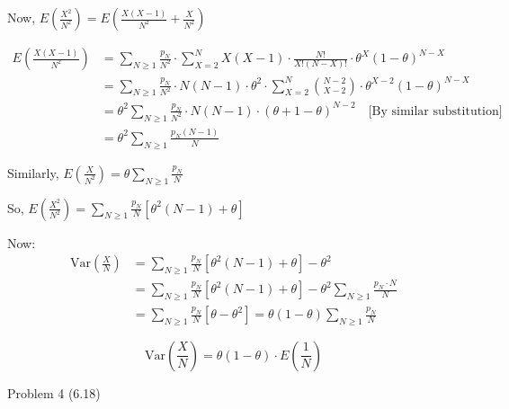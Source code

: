 \documentclass[12pt,a4paper,onecolumn]{exam}
\newcommand{\questionheader}[1]{%
  \begin{tcolorbox}[
    enhanced,
    colback=black,
    coltext=white,
    boxrule=0pt,
    fontupper=\Large\bfseries,
    arc=4mm
  ]
  #1
  \end{tcolorbox}%
}
\begin{document}
\begin{solution}
Now, $E\left(\frac{X^2}{N^2}\right) = E\left(\frac{X(X-1)}{N^2} + \frac{X}{N^2}\right)$

\begin{align*}
E\left(\frac{X(X-1)}{N^2}\right) &= \sum_{N \geq 1} \frac{p_N}{N^2} \cdot \sum_{X=2}^{N} X(X-1) \cdot \frac{N!}{X!(N-X)!} \cdot \theta^X (1-\theta)^{N-X} \\
&= \sum_{N \geq 1} \frac{p_N}{N^2} \cdot N(N-1) \cdot \theta^2 \cdot \sum_{X=2}^{N} \binom{N-2}{X-2} \cdot \theta^{X-2} (1-\theta)^{N-X} \\
&= \theta^2 \sum_{N \geq 1} \frac{p_N}{N^2} \cdot N(N-1) \cdot (\theta + 1 - \theta)^{N-2} \quad \text{[By similar substitution]} \\
&= \theta^2 \sum_{N \geq 1} \frac{p_N (N-1)}{N}
\end{align*}

Similarly, $E\left(\frac{X}{N^2}\right) = \theta \sum_{N \geq 1} \frac{p_N}{N}$

So, $E\left(\frac{X^2}{N^2}\right) = \sum_{N \geq 1} \frac{p_N}{N} \left[\theta^2(N-1) + \theta\right]$

Now:
\begin{align*}
\text{Var}\left(\frac{X}{N}\right) &= \sum_{N \geq 1} \frac{p_N}{N} \left[\theta^2(N-1) + \theta\right] - \theta^2 \\
&= \sum_{N \geq 1} \frac{p_N}{N} \left[\theta^2(N-1) + \theta\right] - \theta^2 \sum_{N \geq 1} \frac{p_N \cdot N}{N} \\
&= \sum_{N \geq 1} \frac{p_N}{N} \left[\theta - \theta^2\right] = \theta(1-\theta) \sum_{N \geq 1} \frac{p_N}{N}
\end{align*}

\[
\boxed{\text{Var}\left(\frac{X}{N}\right) = \theta(1-\theta) \cdot E\left(\frac{1}{N}\right)}
\]
\end{solution}

\questionheader{Problem 4 (6.18)}
\end{document}
